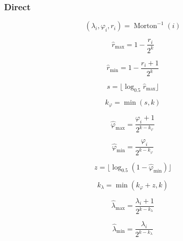 \subsubsection{Direct}


\begin{equation*}
( \lambda_i, \varphi_i, r_i ) = \operatorname{Morton}^{-1} (i)%
\end{equation*}

\begin{equation*}
\hat{r}_\mathrm{max} = 1 - \frac{r_i}{2^k}
\end{equation*}

\begin{equation*}
\hat{r}_\mathrm{min} = 1 - \frac{r_i + 1}{2^k}
\end{equation*}

\begin{equation*}
s = \lfloor \log_{0.5} \hat{r}_\mathrm{max} \rfloor
\end{equation*}

\begin{equation*}
k_\varphi = \min ( s, k )
\end{equation*}

\begin{equation*}
\hat{\varphi}_\mathrm{max} = \frac{\varphi_i + 1}{2^{k - k_\varphi}}
\end{equation*}

\begin{equation*}
\hat{\varphi}_\mathrm{min} = \frac{\varphi_i}{2^{k - k_\varphi}}
\end{equation*}

\begin{equation*}
z = \lfloor \log_{0.5} ( 1 - \hat{\varphi}_\mathrm{min} ) \rfloor
\end{equation*}

\begin{equation*}
k_\lambda = \min ( k_\varphi + z, k )
\end{equation*}

\begin{equation*}
\hat{\lambda}_\mathrm{max} = \frac{\lambda_i + 1}{2^{k - k_\lambda}}
\end{equation*}

\begin{equation*}
\hat{\lambda}_\mathrm{min} = \frac{\lambda_i}{2^{k - k_\lambda}}
\end{equation*}


